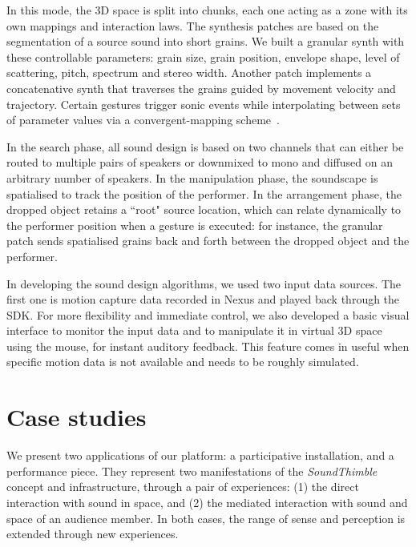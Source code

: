 \documentclass{nime-alternate}
\begin{document}
In this mode, the 3D space is split into chunks, each one acting as a zone with its own mappings and interaction laws. The synthesis patches are based on the segmentation of a source sound into short grains. We built a granular synth with these controllable parameters: grain size, grain position, envelope shape, level of scattering, pitch, spectrum and stereo width. Another patch implements a concatenative synth that traverses the grains guided by movement velocity and trajectory. Certain gestures trigger sonic events while interpolating between sets of parameter values via a convergent-mapping scheme~\cite{102}. %


In the search phase, all sound design is based on two channels that can either be routed to multiple pairs of speakers or downmixed to mono and diffused on an arbitrary number of speakers. In the manipulation phase, the soundscape is spatialised to track the position of the performer. In the arrangement phase, the dropped object retains a ``root" source location, which can relate dynamically to the performer position when a gesture is executed: for instance, the granular patch sends spatialised grains back and forth between the dropped object and the performer.


In developing the sound design algorithms, we used two input data sources. The first one is motion capture data recorded in Nexus and played back through the SDK. For more flexibility and immediate control, we also developed a basic visual interface to monitor the input data and to manipulate it in virtual 3D space using the mouse, for instant auditory feedback. This feature comes in useful when specific motion data is not available and needs to be roughly simulated.

\section{Case studies}
\label{sec:case}

We present two applications of our platform: a participative installation, and a performance piece. They represent two manifestations of the \textit{SoundThimble} concept and infrastructure, through a pair of experiences: (1) the direct interaction with sound in space, and (2) the mediated interaction with sound and space of an audience member. In both cases, the range of sense and perception is extended through new experiences.
\end{document}
